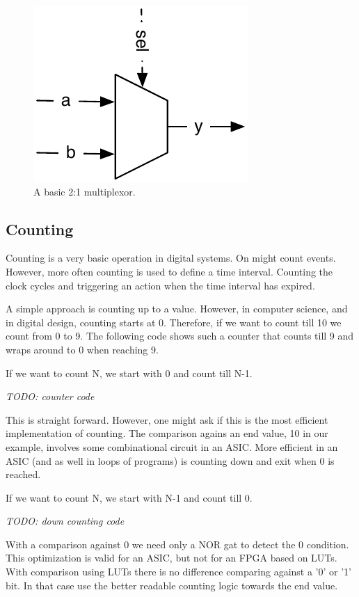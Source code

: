 \documentclass[a4paper]{article}
\newcommand{\todo}[1]{{\emph{TODO: #1}}}
\begin{document}
\begin{figure}
  \centering
  \includegraphics{figures/mux}

  \caption{A basic 2:1 multiplexor.}
  \label{fig:mux}
\end{figure}


\subsection{Counting}

Counting is a very basic operation in digital systems. On might count events.
However, more often counting is used to define a time interval. Counting the
clock cycles and triggering an action when the time interval has expired.

A simple approach is counting up to a value. However, in computer science,
and in digital design, counting starts at 0. Therefore, if we want to count till
10 we count from 0 to 9. The following code shows such a counter that counts
till 9 and wraps around to 0 when reaching 9.

If we want to count N, we start with 0 and count till N-1.

\todo{counter code}



This is straight forward. However, one might ask if this is the most efficient
implementation of counting. The comparison agains an end value, 10 in our
example, involves some combinational circuit in an ASIC. More efficient in an
ASIC (and as well in loops of programs) is counting down and exit when 0
is reached.

If we want to count N, we start with N-1 and count till 0.

\todo{down counting code}

With a comparison against 0 we need only a NOR gat to detect the 0 condition.
This optimization is valid for an ASIC, but not for an FPGA based on LUTs.
With comparison using LUTs there is no difference comparing against a '0' or
'1' bit. In that case use the better readable counting logic towards the end value.
\end{document}

